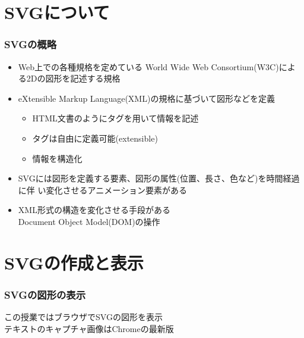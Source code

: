 

\frame{\maketitle}
\section{SVGについて}
\begin{frame}[containsverbatim]
 \frametitle{SVGの概略}
 \begin{itemize}
  \item Web上での各種規格を定めている World Wide Web Consortium(W3C)によ
        る2Dの図形を記述する規格
  \item eXtensible Markup Language(XML)の規格に基づいて図形などを定義
        \begin{itemize}
         \item HTML文書のようにタグを用いて情報を記述
         \item タグは自由に定義可能(extensible)
         \item 情報を構造化
        \end{itemize}
  \item SVGには図形を定義する要素、図形の属性(位置、長さ、色など)を時間経過に伴
        い変化させるアニメーション要素がある
  \item XML形式の構造を変化させる手段がある\\
        Document Object Model(DOM)の操作
 \end{itemize}
\end{frame}
 \section{SVGの作成と表示}
\begin{frame}[containsverbatim]
 \frametitle{SVGの図形の表示}
 この授業ではブラウザでSVGの図形を表示\\[1ex]
 
 テキストのキャプチャ画像はChromeの最新版
\end{frame}
